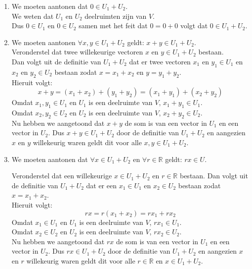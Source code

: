 \documentclass[lineaire_algebra_oplossingen.tex]{subfiles}
\begin{document}
\begin{enumerate}
\item We moeten aantonen dat $0 \in U_1 + U_2$.\\
We weten dat $U_1$ en $U_2$ deelruimten zijn van $V$.\\
Dus $0 \in U_1$ en $0 \in U_2$ samen met het feit dat $0 = 0 + 0$ volgt dat $0 \in U_1 + U_2$.

\item We moeten aantonen $\forall x,y \in U_1 + U_2$ geldt: $x + y \in U_1 + U_2$.\\
Veronderstel dat twee willekeurige vectoren $x$ en $y \in U_1 + U_2$ bestaan.\\
Dan volgt uit de definitie van $U_1 + U_2$ dat er twee vectoren $x_1$ en $y_1 \in U_1$ en $x_2$ en $y_2 \in U_2$ bestaan zodat $x = x_1 + x_2$ en $y = y_1 + y_2$.\\
Hieruit volgt:
$$x + y = (x_1 + x_2) + (y_1 + y_2) = (x_1 + y_1) + (x_2 + y_2)$$
Omdat $x_1, y_1 \in U_1$ en $U_1$ is een deelruimte van $V$, $x_1 + y_1 \in U_1$.\\
Omdat $x_2, y_2 \in U_2$ en $U_2$ is een deelruimte van $V$, $x_2 + y_2 \in U_2$.\\
Nu hebben we aangetoond dat $x+y$ de som is van een vector in $U_1$ en een vector in $U_2$. 
Dus $x + y \in U_1 + U_2$ door de definitie van $U_1 + U_2$ en aangezien $x$ en $y$ willekeurig waren geldt dit voor alle $x,y \in U_1 + U_2$.

\item We moeten aantonen dat $\forall x \in U_1 + U_2$ en $\forall r \in \mathbb{R}$ geldt: $rx \in U$.

Veronderstel dat een willekeurige $x \in U_1 + U_2$ en $r \in \mathbb{R}$ bestaan. Dan volgt uit de definitie van $U_1 + U_2$ dat er een $x_1 \in U_1$ en $x_2 \in U_2$ bestaan zodat $x = x_1 + x_2$.\\
Hieruit volgt:
$$rx = r(x_1+x_2) = rx_1+rx_2$$
Omdat $x_1 \in U_1$ en $U_1$ is een deelruimte van $V$, $rx_1 \in U_1$.\\
Omdat $x_2 \in U_2$ en $U_2$ is een deelruimte van $V$, $rx_2 \in U_2$.\\
Nu hebben we aangetoond dat $rx$ de som is van een vector in $U_1$ en een vector in $U_2$. 
Dus $rx \in U_1 + U_2$ door de definitie van $U_1 + U_2$ en aangezien $x$ en $r$ willekeurig waren geldt dit voor alle $r \in \mathbb{R}$ en $x \in U_1 + U_2$.
\end{enumerate}
\end{document}

